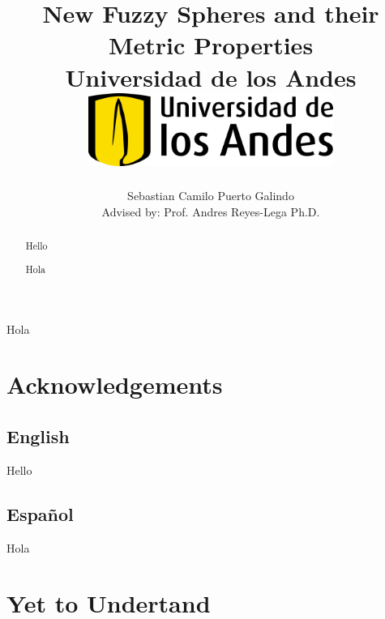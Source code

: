 \documentclass[12pt]{report}
\title 
{
	{New Fuzzy Spheres and their Metric Properties}\\
	{\large Universidad de los Andes}\\
	\vspace{1.5cm}
	{\includegraphics[width = 0.6\textwidth]{logo.png}}	
}
\author{Sebastian Camilo Puerto Galindo\\[1cm]{\small Advised by: Prof. Andres Reyes-Lega Ph.D.}}
\newenvironment{dedication}
  {\clearpage           %
   \thispagestyle{empty}%
   \vspace*{\stretch{1}}%
   \raggedleft          %
  }
  {\par %
   \vspace{\stretch{3}} %
   \clearpage           %
  }
\theoremstyle{definition}
\begin{document}

\maketitle

\begin{dedication}
{\LARGE\calligra Hola}
\end{dedication}

\begin{abstract}
Hello
\end{abstract}

\begin{otherlanguage}{spanish}
\begin{abstract}
Hola
\end{abstract}
\end{otherlanguage}

\newpage

\chapter*{Acknowledgements}

\section*{English}
Hello
\begin{otherlanguage}{spanish}
\section*{Español}
Hola
\end{otherlanguage}

\tableofcontents


\chapter*{Yet to Undertand}
 \label{chp:understand}

\end{document}
